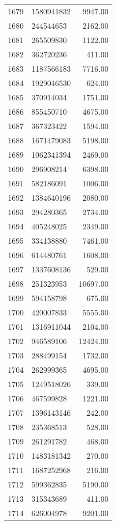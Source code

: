 \begin{table}[ht]
\begin{tabular}{rlr}
  1679 & 1580941832 & 9947.00 \\ 
  1680 & 244544653 & 2162.00 \\ 
  1681 & 265509830 & 1122.00 \\ 
  1682 & 362720236 & 411.00 \\ 
  1683 & 1187566183 & 7716.00 \\ 
  1684 & 1929046530 & 624.00 \\ 
  1685 & 370914034 & 1751.00 \\ 
  1686 & 855450710 & 4675.00 \\ 
  1687 & 367323422 & 1594.00 \\ 
  1688 & 1671479083 & 5198.00 \\ 
  1689 & 1062341394 & 2469.00 \\ 
  1690 & 296908214 & 6398.00 \\ 
  1691 & 582186091 & 1006.00 \\ 
  1692 & 1384640196 & 2080.00 \\ 
  1693 & 294280365 & 2734.00 \\ 
  1694 & 405248025 & 2349.00 \\ 
  1695 & 334138880 & 7461.00 \\ 
  1696 & 614480761 & 1608.00 \\ 
  1697 & 1337608136 & 529.00 \\ 
  1698 & 251323953 & 10697.00 \\ 
  1699 & 594158798 & 675.00 \\ 
  1700 & 420007833 & 5555.00 \\ 
  1701 & 1316911044 & 2104.00 \\ 
  1702 & 946589106 & 12424.00 \\ 
  1703 & 288499154 & 1732.00 \\ 
  1704 & 262999365 & 4695.00 \\ 
  1705 & 1249518026 & 339.00 \\ 
  1706 & 467599828 & 1221.00 \\ 
  1707 & 1396143146 & 242.00 \\ 
  1708 & 235368513 & 528.00 \\ 
  1709 & 261291782 & 468.00 \\ 
  1710 & 1483181342 & 270.00 \\ 
  1711 & 1687252968 & 216.00 \\ 
  1712 & 599362835 & 5190.00 \\ 
  1713 & 315343689 & 411.00 \\ 
  1714 & 626004978 & 9201.00 \\ 

\end{tabular}
\end{table}
